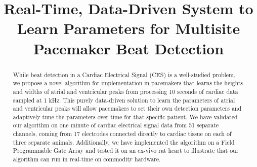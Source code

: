 \documentclass[conference]{IEEEtran}
\begin{document}
%
\title{Real-Time, Data-Driven System to Learn
Parameters for Multisite Pacemaker Beat Detection}


\author{
}







\maketitle

\begin{abstract}
While beat detection in a Cardiac Electrical 
Signal (CES) is a well-studied problem, we propose a novel
algorithm for implementation in pacemakers that learns the
heights and widths of atrial and ventricular peaks from
processing 10 seconds of cardiac data sampled at 1 kHz. 
This purely data-driven solution to learn the parameters of atrial
and ventricular peaks will allow pacemakers to set their own 
detection parameters and adaptively tune
the parameters over time for that specific patient.
We have validated our algorithm on one minute of cardiac electrical signal data from 51 separate channels,
coming from 17 electrodes connected directly to cardiac tissue on each of three separate animals.
Additionally, we have implemented the algorithm on a
Field Programmable Gate Array and tested it on an ex-vivo rat
heart to illustrate that our algorithm can run in real-time on commodity hardware.
\end{abstract}
\end{document}
